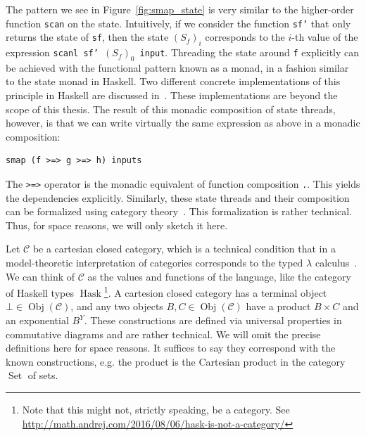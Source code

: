 The pattern we see in Figure~\ref{fig:smap_state} is very similar to the higher-order function \texttt{scan} on the state.
Intuitively, if we consider the function \texttt{sf'} that only returns the state of \texttt{sf}, then the state $(S_f)_i$ corresponds to the $i$-th value of the expression \texttt{scanl sf' $(S_f)_0$ input}.
Threading the state around \texttt{f} explicitly can be achieved with the functional pattern known as a monad, in a fashion similar to the state monad in Haskell. 
Two different concrete implementations of this principle in Haskell are discussed in~\cite{ertel_haskell19}. These implementations are beyond the scope of this thesis.
The result of this monadic composition of state threads, however, is that we can write virtually the same expression as above in a monadic composition:

\begin{verbatim}
smap (f >=> g >=> h) inputs
\end{verbatim}

The \texttt{>=>} operator is the monadic equivalent of function composition \texttt{.}. This yields the dependencies explicitly.
Similarly, these state threads and their composition can be formalized using category theory~\cite{ertel_haskellsup19}.
This formalization is rather technical. Thus, for space reasons, we will only sketch it here.

Let $\mathcal{C}$ be a cartesian closed category, which is a technical condition that in a model-theoretic interpretation of categories corresponds to the typed $\lambda$ calculus~\cite{huet1985cartesian}.
We can think of $\mathcal{C}$ as the values and functions of the language, like the category of Haskell types $\operatorname{Hask}$\footnote{Note that this might not, strictly speaking, be a category. See \url{http://math.andrej.com/2016/08/06/hask-is-not-a-category/}}.
A cartesion closed category has a terminal object $\bot \in \operatorname{Obj}(\mathcal{C})$, and any two objects $B,C \in \operatorname{Obj}(\mathcal{C})$ have a product $B \times C$ and an exponential $B^Y$.
These constructions are defined via universal properties in commutative diagrams and are rather technical.
We will omit the precise definitions here for space reasons.
It suffices to say they correspond with the known constructions, e.g. the product is the Cartesian product in the category $\operatorname{Set}$ of sets. 

